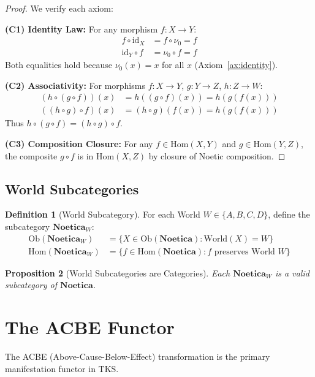 \documentclass[11pt,twoside,openright]{book}
\theoremstyle{definition}
\newtheorem{definition}{Definition}[chapter]
\theoremstyle{plain}
\newtheorem{proposition}[definition]{Proposition}
\theoremstyle{remark}
\newcommand{\Noetica}{\mathbf{Noetica}}
\newcommand{\noe}[1]{\nu_{#1}}
\newcommand{\Ob}{\mathrm{Ob}}
\newcommand{\Hom}{\mathrm{Hom}}
\newcommand{\id}{\mathrm{id}}
\begin{document}
\begin{proof}
We verify each axiom:

\textbf{(C1) Identity Law:}
For any morphism $f : X \to Y$:
\begin{align}
f \circ \id_X &= f \circ \noe{0} = f \\
\id_Y \circ f &= \noe{0} \circ f = f
\end{align}
Both equalities hold because $\noe{0}(x) = x$ for all $x$ (Axiom~\ref{ax:identity}).

\textbf{(C2) Associativity:}
For morphisms $f : X \to Y$, $g : Y \to Z$, $h : Z \to W$:
\begin{align}
(h \circ (g \circ f))(x) &= h((g \circ f)(x)) = h(g(f(x))) \\
((h \circ g) \circ f)(x) &= (h \circ g)(f(x)) = h(g(f(x)))
\end{align}
Thus $h \circ (g \circ f) = (h \circ g) \circ f$.

\textbf{(C3) Composition Closure:}
For any $f \in \Hom(X, Y)$ and $g \in \Hom(Y, Z)$, the composite $g \circ f$ is in $\Hom(X, Z)$ by closure of Noetic composition.
\end{proof}

\section{World Subcategories}

\begin{definition}[World Subcategory]
\label{def:world-subcat}
For each World $W \in \{A, B, C, D\}$, define the subcategory $\Noetica_W$:
\begin{align}
\Ob(\Noetica_W) &= \{X \in \Ob(\Noetica) : \mathrm{World}(X) = W\} \\
\Hom(\Noetica_W) &= \{f \in \Hom(\Noetica) : f \text{ preserves World } W\}
\end{align}
\end{definition}

\begin{proposition}[World Subcategories are Categories]
\label{prop:world-subcat}
Each $\Noetica_W$ is a valid subcategory of $\Noetica$.
\end{proposition}

\chapter{The ACBE Functor}
\label{ch:acbe-functor}

The ACBE (Above-Cause-Below-Effect) transformation is the primary manifestation functor in TKS.
\end{document}
